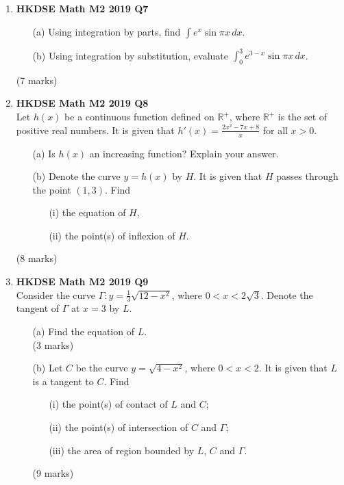 \documentclass{report}
\begin{document}
\begin{enumerate}
	\item \textbf{HKDSE Math M2 2019 Q7}
	\begin{enumerate}
		\item [(a)]Using integration by parts, find $\displaystyle\int e^x\sin{\pi x}\, dx$. 
		\item [(b)]Using integration by substitution, evaluate $\displaystyle\int_{0}^{3} e^{3-x}\sin{\pi x} \,dx$.
	\end{enumerate}
	(7 marks)

	\item \textbf{HKDSE Math M2 2019 Q8}\\
	Let $h(x)$ be a continuous function defined on $\mathbb{R}^+$, where $\mathbb{R}^+$ is the set of positive real numbers. It is given that $\displaystyle h'(x) = \frac{2x^2 -7x+8}{x}$ for all $x > 0$. 
	\begin{enumerate}
		\item [(a)] Is $h(x)$ an increasing function? Explain your answer. 
		\item [(b)] Denote the curve $y = h(x)$ by $H$. It is given that $H$ passes through the point $(1,3)$. Find  
		\begin{enumerate}
			\item [(i)]the equation of $H$,
			\item [(ii)]the point(s) of inflexion of $H$.
		\end{enumerate} 
	\end{enumerate}
	(8 marks)

	\item \textbf{HKDSE Math M2 2019 Q9}\\
	Consider the curve $\Gamma : y = \displaystyle\frac{1}{3}\sqrt{12-x^2}$, where $0<x<2\sqrt{3}$. Denote the tangent of $\Gamma$ at $x = 3$ by $L$.  
	\begin{enumerate}
		\item [(a)]Find the equation of $L$. \\(3 marks)
		\item [(b)]Let $C$ be the curve $y = \sqrt{4-x^2}$, where $0<x<2$. It is given that $L$ is a tangent to $C$. Find 
		\begin{enumerate}
			\item [(i)]the point(s) of contact of $L$ and $C$;  
			\item [(ii)]the point(s) of intersection of $C$ and $\Gamma$;  
			\item [(iii)]the area of region bounded by $L$, $C$ and $\Gamma$.
		\end{enumerate}
		(9 marks)
	\end{enumerate}


\end{enumerate}
\end{document}
